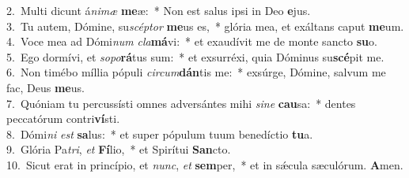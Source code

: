 {2.~}Multi dicunt á\textit{ni}\textit{mæ} \textbf{me}æ:~* Non est salus ipsi in Deo \textbf{e}jus.\\
{3.~}Tu autem, Dómine, su\textit{scép}\textit{tor} \textbf{me}us es,~* glória mea, et exáltans caput \textbf{me}um.\\
{4.~}Voce mea ad Dómi\textit{num} \textit{cla}\textbf{má}vi:~* et exaudívit me de monte sancto \textbf{su}o.\\
{5.~}Ego dormívi, et \textit{so}\textit{po}\textbf{rá}tus sum:~* et exsurréxi, quia Dóminus su\textbf{scé}pit me.\\
{6.~}Non timébo míllia pópuli \textit{cir}\textit{cum}\textbf{dán}tis me:~* exsúrge, Dómine, salvum me fac, Deus \textbf{me}us.\\
{7.~}Quóniam tu percussísti omnes adversántes mihi \textit{si}\textit{ne} \textbf{cau}sa:~* dentes peccatórum contri\textbf{ví}sti.\\
{8.~}Dómi\textit{ni} \textit{est} \textbf{sa}lus:~* et super pópulum tuum benedíctio \textbf{tu}a.\\
{9.~}Glória Pa\textit{tri}, \textit{et} \textbf{Fí}lio,~* et Spirítui \textbf{San}cto.\\
{10.~}Sicut erat in princípio, et \textit{nunc}, \textit{et} \textbf{sem}per,~* et in sǽcula sæculórum. \textbf{A}men.\\
